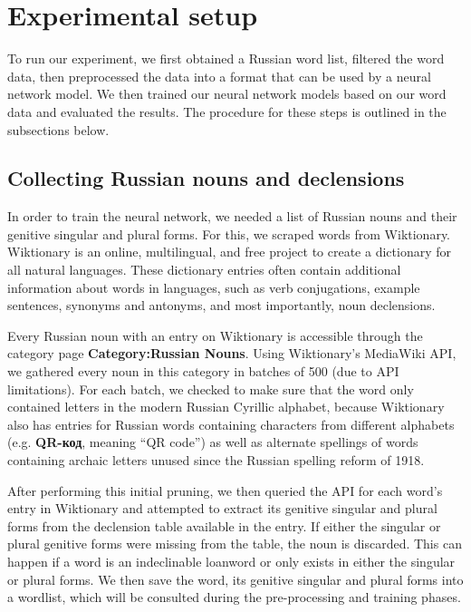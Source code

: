 \documentclass[11pt,a4paper]{article}
\begin{document}
\section{Experimental setup}

To run our experiment, we first obtained a Russian word list, filtered the
word data, then preprocessed the data into a format that can be used by a
neural network model. We then trained our neural network models based on
our word data and evaluated the results. The procedure for these steps
is outlined in the subsections below.

\subsection{Collecting Russian nouns and declensions}

In order to train the neural network, we needed a list of Russian nouns
and their genitive singular and plural forms. For this, we scraped words
from Wiktionary. Wiktionary is an online, multilingual, and free project
to create a dictionary for all natural languages. These dictionary entries
often contain additional information about words in languages, such as verb
conjugations, example sentences, synonyms and antonyms, and most importantly,
noun declensions.

Every Russian noun with an entry on Wiktionary is accessible through the category
page \textbf{Category:Russian Nouns}. Using Wiktionary's MediaWiki API, we gathered
every noun in this category in batches of 500 (due to API limitations). For each
batch, we checked to make sure that the word only contained letters in the modern
Russian Cyrillic alphabet, because Wiktionary also has entries for Russian words
containing characters from different alphabets (e.g. \textbf{\foreignlanguage{russian}{QR-код}},
meaning ``QR code'') as well as alternate spellings of words containing archaic letters 
unused since the Russian spelling reform of 1918.

After performing this initial pruning, we then queried the API for each word's
entry in Wiktionary and attempted to extract its genitive singular and plural
forms from the declension table available in the entry. If either the singular
or plural genitive forms were missing from the table, the noun is discarded.
This can happen if a word is an indeclinable loanword or only exists in either
the singular or plural forms. We then save the word, its genitive singular and
plural forms into a wordlist, which will be consulted during the pre-processing
and training phases.
\end{document}
